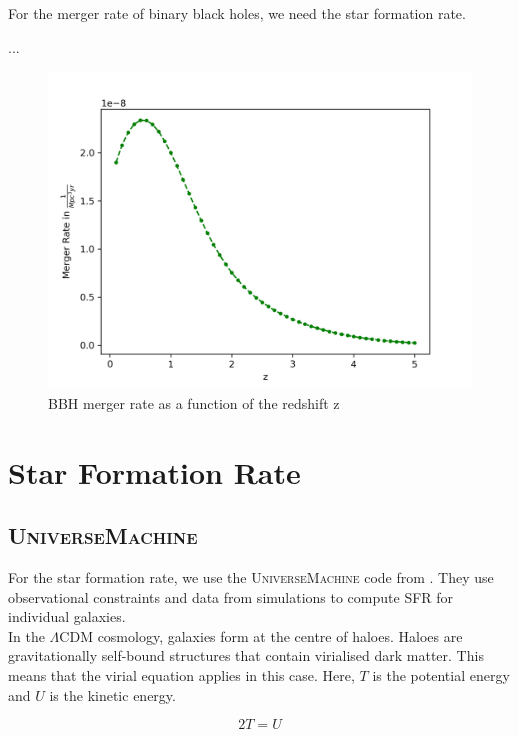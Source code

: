 For the merger rate of binary black holes, we need the star formation rate. 

...

\begin{figure}[h]
    \centering
    \includegraphics[width=1\linewidth]{Images/bbh_merger_rate.png}
    \caption{BBH merger rate as a function of the redshift z}
    \label{bbh_merger_rate}
   \end{figure} 

\section{Star Formation Rate}
\subsection{\textsc{UniverseMachine}}

For the star formation rate, we use the \textsc{UniverseMachine} code from \cite{behroozi_universemachine_2019}. They use observational constraints and data from simulations to compute SFR for individual galaxies. \\

In the $\Lambda$CDM cosmology, galaxies form at the centre of haloes. Haloes are gravitationally self-bound structures that contain virialised dark matter. This means that the virial equation applies in this case. Here, $T$ is the potential energy and $U$ is the kinetic energy.

\begin{equation}
    2T=U
\end{equation}

